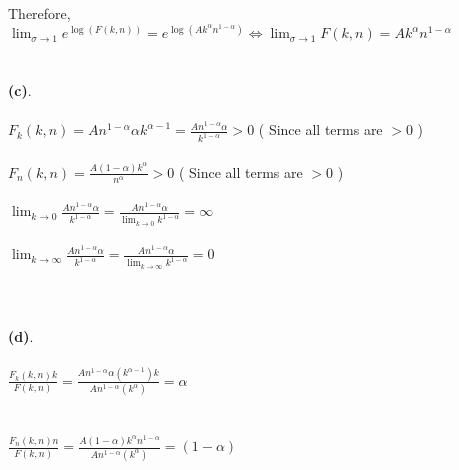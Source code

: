 \documentclass[11zpt]{article}
\newenvironment{problem}[2][Problem]{\begin{trivlist}
\item[\hskip \labelsep {\bfseries #1}\hskip \labelsep {\bfseries #2.}]}{\end{trivlist}}
\begin{document}
\begin{problem}{2}
Therefore, $\lim_{\sigma \to 1} e^{\log(F(k, n))}  =e^{\log(A k^\alpha n^{1-\alpha})} \iff  \lim_{\sigma \to 1} F(k, n) =  A k^\alpha n^{1-\alpha} $ 
\\
\\
\\
\textbf{(c)}. 
\\
\\
$F_k(k,n) = A n^{1-\alpha} \alpha k^{\alpha - 1} = \frac{A n^{1-\alpha} \alpha }{k^{1- \alpha }}  > 0 $ ( Since all terms are $> 0$ )
\\
\\
$F_n(k,n) = \frac{ A (1- \alpha) k^{\alpha }}{n^\alpha} > 0 $ ( Since all terms are $> 0 $ ) 
\\
\\
$\lim_{k \to 0 } \frac{A n^{1-\alpha} \alpha }{k^{1- \alpha }} = \frac{A n^{1-\alpha} \alpha }{\lim_{k \to 0 }  k^{1- \alpha }} = \infty$
\\
\\
$\lim_{k \to \infty } \frac{A n^{1-\alpha} \alpha }{k^{1- \alpha }} = \frac{A n^{1-\alpha} \alpha }{\lim_{k \to \infty }  k^{1- \alpha }} = 0$
\\
\\
\\
\\
\textbf{(d)}. 
\\
\\
$\frac{F_k(k,n)k}{F(k,n)} = \frac{ A n^{1-\alpha} \alpha (k^{\alpha - 1}) k}{ A n^{1-\alpha}  (k^{\alpha})}  = \alpha $ 
\\
\\
\\
$\frac{F_n(k,n)n}{F(k,n)} = \frac{ A (1- \alpha) k^{\alpha }n^{1-\alpha}}{A n^{1-\alpha}  (k^{\alpha})} = (1- \alpha) $
\\
\\
\end{problem}
\end{document}
